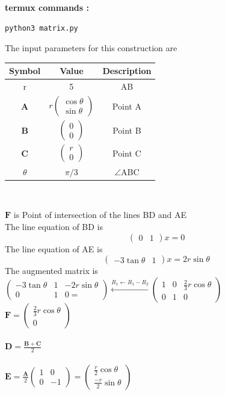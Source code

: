 \documentclass[10pt, a4paper]{article}
\newcommand{\myvec}[1]{\ensuremath{\begin{pmatrix}#1\end{pmatrix}}}
\let\vec\mathbf
\begin{document}
\textbf{termux commands :}
\begin{lstlisting}
python3 matrix.py
\end{lstlisting}


The input parameters for this construction are 
\begin{center}
\begin{tabular}{|c|c|c|}
 \hline
 \textbf{Symbol}&\textbf{Value}&\textbf{Description}\\
 \hline
 r&5&AB\\
 \hline

 $\vec{A}$&$r\myvec{\cos\theta \\ \sin\theta}$%
 &Point A\\
 \hline
 $\vec{B}$&$\myvec{0 \\ 0}$%
 &Point B\\
 \hline
 $\vec{C}$&$\myvec{r \\ 0}$%
 &Point C\\
 \hline
 ${\theta}$& $\pi/3$&$ \angle $ABC\\ 
 \hline
\end{tabular}
\end{center}
\
\\
\begin{center}
$\vec{F}$ is Point of intersection of the lines BD and AE
\\
The line equation of BD is 
\begin{equation}
    \myvec{0&1}x = 0
\end{equation}
The line equation of AE is
\begin{equation}
    \myvec{-3\tan{\theta}&1}x = 2r\sin{\theta}
\end{equation}
The augmented matrix is\\ 
    $\myvec{-3\tan{\theta}&1&-2r\sin{\theta} \\ 0&1&0=}
    \xleftarrow[]{R_1 \leftarrow R_1 - R_2}
    \myvec{	    1 & 0  & \frac{2}{3}r\cos{\theta}
			    \\
			    0 & 1 & 0}$\\
   $\vec{F} = \myvec{\frac{2}{3}r\cos{\theta}\\0}$
   \ 
   \\
   \ 
   \\
   $\vec{D} = \frac{\vec{B+C}}{2}$\\
   \
\\
	$\vec{E} = {\frac{\vec{A}}{2}} \myvec{1& 0\\0& -1}=\myvec{\frac{r}{2}\cos{\theta}\\ \frac{-r}{2}\sin{\theta}}$
\\

\end{center}
\end{document}
